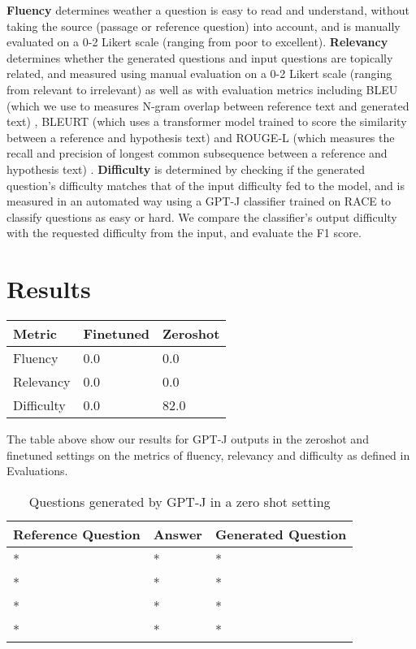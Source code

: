 \documentclass[11pt]{article}
\begin{document}
\textbf{Fluency} determines weather a question is easy to read and understand, without taking the source (passage or reference question) into account, and is manually evaluated on a 0-2 Likert scale (ranging from poor to excellent). \textbf{Relevancy} \cite{relevancy:5} determines whether the generated questions and input questions are topically related, and measured using manual evaluation on a 0-2 Likert scale (ranging from relevant to irrelevant) as well as with evaluation metrics including BLEU (which we use to measures N-gram overlap between reference text and generated text) \citep{bleu:12}, BLEURT (which uses a transformer model trained to score the similarity between a reference and hypothesis text) \citep{bleurt:11} and ROUGE-L (which measures the recall and precision of longest common subsequence between a reference and hypothesis text) \citep{rouge:13}. \textbf{Difficulty} is determined by checking if the generated question’s difficulty matches that of the input difficulty fed to the model, and is measured in an automated way using a GPT-J classifier trained on RACE to classify questions as easy or hard. We compare the classifier's output difficulty with the requested difficulty from the input, and evaluate the F1 score.  

\section{Results}

\begin{table}[h]
\centering
\begin{tabular}{lll}
\hline
\textbf{Metric} & \textbf{Finetuned} & \textbf{Zeroshot}\\
\hline
Fluency & 0.0 & 0.0 \\
Relevancy & 0.0 & 0.0 \\
Difficulty & 0.0 & 82.0 \\
\hline
\end{tabular}
\end{table}

The table above show our results for GPT-J outputs in the zeroshot and finetuned settings on the metrics of fluency, relevancy and difficulty as defined in Evaluations. 

\begin{table*}
\centering
\begin{tabular}{lll}
\hline
\textbf{Reference Question} & \textbf{Answer} & \textbf{Generated Question}\\
\hline
* & * & * \\
\hline
* & * & * \\
\hline
* & * & * \\
\hline
* & * & * \\
\hline
\end{tabular}
\caption{\label{citation-guide}
Questions generated by GPT-J in a zero shot setting
}
\end{table*}
\end{document}
